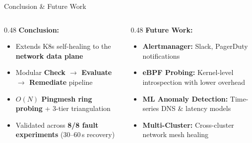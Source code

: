 \documentclass[aspectratio=169, 11pt]{beamer}
\begin{document}


\begin{frame}{Conclusion \& Future Work}

\begin{columns}[T]
\begin{column}{0.48\textwidth}
\footnotesize
\textbf{Conclusion:}
\begin{itemize}
  \item Extends K8s self-healing to the \textbf{network data plane}
  \item Modular \textbf{Check $\to$ Evaluate $\to$ Remediate} pipeline
  \item \textbf{$O(N)$ Pingmesh ring probing} + 3-tier triangulation
  \item Validated across \textbf{8/8 fault experiments} (30--60\,s recovery)
\end{itemize}
\end{column}

\begin{column}{0.48\textwidth}
\footnotesize
\textbf{Future Work:}
\begin{itemize}
  \item \textbf{Alertmanager:} Slack, PagerDuty notifications
  \item \textbf{eBPF Probing:} Kernel-level introspection with lower overhead
  \item \textbf{ML Anomaly Detection:} Time-series DNS \& latency models
  \item \textbf{Multi-Cluster:} Cross-cluster network mesh healing
\end{itemize}
\end{column}
\end{columns}

\end{frame}


\end{document}
